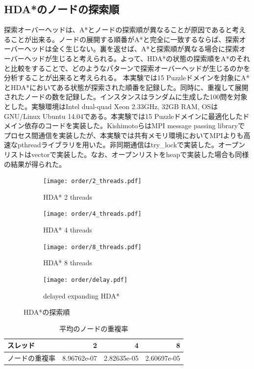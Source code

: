 \documentclass[uplatex]{jsarticle}
\begin{document}
\subsection{HDA*のノードの探索順}
探索オーバーヘッドは、A*とノードの探索順が異なることが原因であると考えることが出来る。ノードの展開する順番がA*と完全に一致するならば、探索オーバーヘッドは全く生じない。裏を返せば、A*と探索順が異なる場合に探索オーバーヘッドが生じると考えられる。よって、HDA*の状態の探索順をA*のそれと比較をすることで、どのようなパターンで探索オーバーヘッドが生じるのかを分析することが出来ると考えられる。
本実験では15 Puzzleドメインを対象にA*とHDA*においてある状態が探索された順番を記録した。同時に、重複して展開されたノードの数を記録した。インスタンスはランダムに生成した100問を対象とした。実験環境はIntel dual-quad Xeon 2.33GHz, 32GB RAM, OSはGNU/Linux Ubuntu 14.04である。本実験では15 Puzzleドメインに最適化したドメイン依存のコードを実装した。KishimotoらはMPI message passing libraryでプロセス間通信を実装したが、本実験では共有メモリ環境においてMPIよりも高速なpthreadライブラリを用いた。非同期通信はtry\_lockで実装した。オープンリストはvectorで実装した。なお、オープンリストをheapで実装した場合も同様の結果が得られた。


\begin{figure}
	\centering
	\begin{subfigure}{0.45\columnwidth}
		\centering
		\texttt{[image: order/2\_threads.pdf]}
		\caption{HDA* 2 threads}
		\label{fig:order_2_threads}
	\end{subfigure}
	\begin{subfigure}{0.45\columnwidth}
		\centering
		\texttt{[image: order/4\_threads.pdf]}
		\caption{HDA* 4 threads}
		\label{fig:order_4_threads}
	\end{subfigure}
	\begin{subfigure}{0.45\columnwidth}
		\centering
		\texttt{[image: order/8\_threads.pdf]}
		\caption{HDA* 8 threads}
		\label{fig:order_8_threads}
	\end{subfigure}
	\begin{subfigure}{0.45\columnwidth}
		\centering
		\texttt{[image: order/delay.pdf]}
		\caption{delayed expanding HDA*}
		\label{fig:order_delay}
	\end{subfigure}
	\caption{HDA*の探索順}
	\label{fig:hdastar_orders}
\end{figure}%

\begin{table}
	\centering
	\begin{tabular}{lrrr} \hline
		スレッド       & 2 & 4 & 8 \\ \hline
		ノードの重複率 & 8.96762e-07 & 2.82635e-05 & 2.60697e-05 \\ \hline
	\end{tabular}
	\caption{平均のノードの重複率}
	\label{hdastar_duplication}
\end{table}
\end{document}
